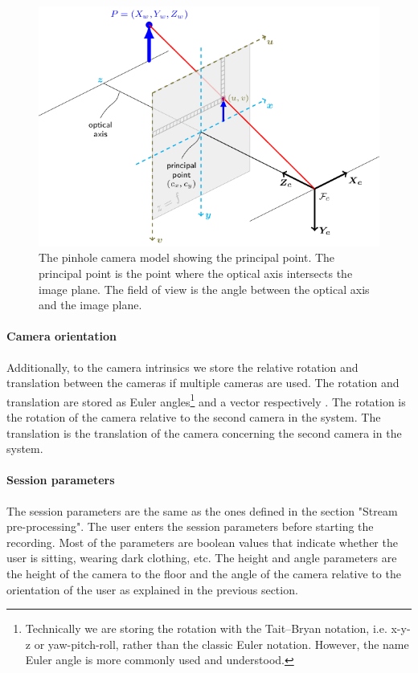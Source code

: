 \begin{figure}[ht]
  \centering
  \includegraphics[width=.9\textwidth]{figures/CameraCalibration/pinhole_camera_model.png}
  \caption[Pinhole camera model]{The pinhole camera model showing the principal point. The principal point is the point where the optical axis intersects the image plane. The field of view is the angle between the optical axis and the image plane.}
  \label{fig:pinhole_camera_model}
\end{figure}

\paragraph{Camera orientation}

Additionally, to the camera intrinsics we store the relative rotation and translation between the cameras if multiple cameras are used. The rotation and translation are stored as Euler angles\footnote{Technically we are storing the rotation with the Tait–Bryan notation, i.e. x-y-z or yaw-pitch-roll, rather than the classic Euler notation. However, the name Euler angle is more commonly used and understood.} and a vector respectively \cite{euler1776formulae}. The rotation is the rotation of the camera relative to the second camera in the system. The translation is the translation of the camera concerning the second camera in the system.

\paragraph{Session parameters}

The session parameters are the same as the ones defined in the section "Stream pre-processing". The user enters the session parameters before starting the recording. Most of the parameters are boolean values that indicate whether the user is sitting, wearing dark clothing, etc. The height and angle parameters are the height of the camera to the floor and the angle of the camera relative to the orientation of the user as explained in the previous section.

